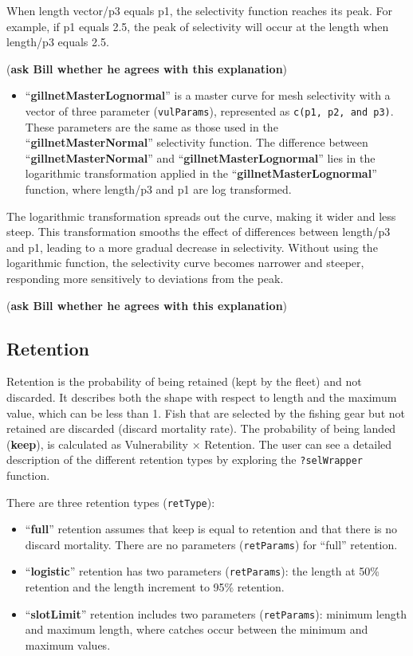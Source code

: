 \documentclass[
]{book}
\providecommand{\tightlist}{%
  \setlength{\itemsep}{0pt}\setlength{\parskip}{0pt}}
\begin{document}
When length vector/p3 equals p1, the selectivity function reaches its peak. For example, if p1 equals 2.5, the peak of selectivity will occur at the length when length/p3 equals 2.5.

(\textbf{ask Bill whether he agrees with this explanation})

\begin{itemize}
\tightlist
\item
  ``\textbf{gillnetMasterLognormal}'' is a master curve for mesh selectivity with a vector of three parameter (\texttt{vulParams}), represented as \texttt{c(p1,\ p2,\ and\ p3)}. These parameters are the same as those used in the ``\textbf{gillnetMasterNormal}'' selectivity function.
  The difference between ``\textbf{gillnetMasterNormal}'' and ``\textbf{gillnetMasterLognormal}'' lies in the logarithmic transformation applied in the ``\textbf{gillnetMasterLognormal}'' function, where length/p3 and p1 are log transformed.
\end{itemize}

The logarithmic transformation spreads out the curve, making it wider and less steep. This transformation smooths the effect of differences between length/p3 and p1, leading to a more gradual decrease in selectivity. Without using the logarithmic function, the selectivity curve becomes narrower and steeper, responding more sensitively to deviations from the peak.

(\textbf{ask Bill whether he agrees with this explanation})

\subsection{Retention}\label{retention}

Retention is the probability of being retained (kept by the fleet) and not discarded. It describes both the shape with respect to length and the maximum value, which can be less than 1. Fish that are selected by the fishing gear but not retained are discarded (discard mortality rate). The probability of being landed (\textbf{keep}), is calculated as Vulnerability × Retention. The user can see a detailed description of the different retention types by exploring the \texttt{?selWrapper} function.

There are three retention types (\texttt{retType}):

\begin{itemize}
\item
  ``\textbf{full}'' retention assumes that keep is equal to retention and that there is no discard mortality. There are no parameters (\texttt{retParams}) for ``full'' retention.
\item
  ``\textbf{logistic}'' retention has two parameters (\texttt{retParams}): the length at 50\% retention and the length increment to 95\% retention.
\item
  ``\textbf{slotLimit}'' retention includes two parameters (\texttt{retParams}): minimum length and maximum length, where catches occur between the minimum and maximum values.
\end{itemize}
\end{document}

